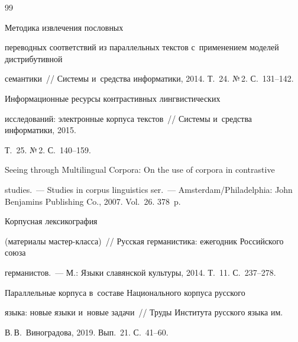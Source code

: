 {\small\frenchspacing


{%




\begin{thebibliography}{99}







 Методика извлечения по\-слов\-ных 


переводных соответствий из параллельных текс\-тов с~применением моделей дистрибутивной 


семантики~/\!\!/ Сис\-те\-мы и~средства информатики, 2014. Т.~24. №\,2. С.~131--142.




 Информационные ресурсы контрастивных лингвистических 


исследований: электронные корпуса текстов~/\!\!/ Сис\-те\-мы и~средства информатики, 2015. 


Т.~25. №\,2. С.~140--159.







 Seeing through Multilingual Corpora: On the use of corpora in contrastive 


studies.~--- Studies in corpus linguistics ser.~--- Amsterdam/Philadelphia: John Benjamins Publishing Co., 2007. Vol.~26. 378~p.







 Корпусная лексикография 


(материалы мас\-тер-клас\-са)~/\!\!/ Русская германистика: ежегодник Российского союза 


германистов.~--- М.: Языки славянской культуры,  2014. Т.~11. С.~237--278.




 Параллельные корпуса в~со\-ста\-ве Национального корпуса русского 


языка: новые языки и~новые задачи~/\!\!/ Труды Института русского языка им.\ 


В.\,В.~Виноградова, 2019. Вып.~21. С.~41--60.









\end{thebibliography}}}
